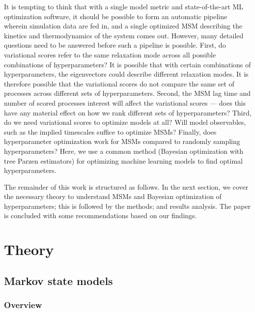 \documentclass[journal=jacsat,manuscript=article]{achemso}
\begin{document}
It is tempting to think that with a single model metric and state-of-the-art ML optimization software, it should be possible to form an automatic pipeline wherein simulation data are fed in, and a single optimized MSM describing the kinetics and thermodynamics of the system comes out. However, many detailed questions need to be answered before such a pipeline is possible. First, do variational scores refer to the same relaxation mode across all possible combinations of hyperparameters?  It is possible that with certain combinations of hyperparameters, the eigenvectors could describe different relaxation modes. It is therefore possible that the variational scores do not compare the same set of processes across different sets of hyperparameters. Second, the MSM lag time and number of scored processes interest will affect the variational scores --- does this have any material effect on how we rank different sets of hyperparameters? Third, do we need variational scores to optimize models at all?  Will model observables, such as the implied timescales suffice to optimize MSMs?  Finally, does hyperparameter optimization work for MSMs compared to randomly sampling hyperparameters?  Here, we use a common method (Bayesian optimization with tree Parzen estimators) for optimizing machine learning models to find optimal hyperparameters. 


The remainder of this work is structured as follows.  In the next section, we cover the necessary theory to understand MSMs and Bayesian optimization of hyperparameters; this is followed by the methods; and results analysis. The paper is concluded with some recommendations based on our findings. 

\section{Theory}\label{theory}
\subsection{Markov state models}
\subsubsection{Overview}
\end{document}
